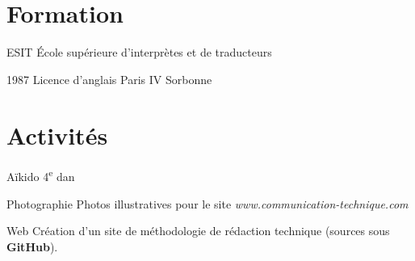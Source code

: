 \documentclass[12pt,a4paper,roman]{moderncv}
\begin{document}
\section{Formation}

        {ESIT}
        {École supérieure d'interprètes et de traducteurs}
        {}
        {}
        {}

\cventry
    {1987}
    {Licence d'anglais}
    { Paris IV Sorbonne}
    {}
    {}
    {}


\section{Activités}

\cvitem
    {Aïkido}
    {4\textsuperscript{e} dan}

\cvitem
    {Photographie}
    {Photos illustratives pour le site \textit{www.communication-technique.com}}

\cvitem
    {Web}
    {Création d'un site de méthodologie de rédaction technique (sources sous
      \textbf{GitHub}).}
\end{document}
